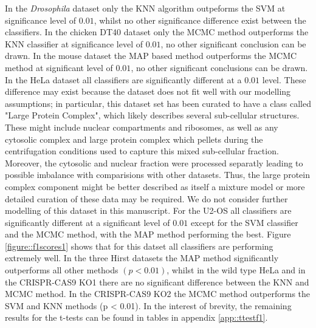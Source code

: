 \documentclass[12pt,english]{article}\usepackage[]{graphicx}\usepackage[]{color}
\begin{document}
In the \textit{Drosophila} dataset only the KNN algorithm outpeforms the SVM at significance level of $0.01$, whilst no other significance
difference exist between the classifiers. In the chicken DT40 dataset only the MCMC method outperforms the KNN classifier at significance level of $0.01$, no other significant conclusion can be drawn. In the mouse dataset the MAP based method outperforms the MCMC method at significant level of $0.01$, no other significant conclusions can be drawn. In the HeLa dataset all classifiers are significantly different at a $0.01$ level. These difference may exist because the dataset does not fit well with our modelling assumptions; in particular, this dataset set has been curated to have a class called "Large Protein Complex", which likely describes several sub-cellular structures. These might include nuclear compartments and ribosomes, as well as any cytosolic complex and large protein complex which pellets during the centrifugation conditions used to capture
this mixed sub-cellular fraction. Moreover, the cytosolic and nuclear fraction were processed separatly leading to possible imbalance with comparisions with other datasets. Thus, the large protein complex component might be better described as itself a mixture model or more detailed curation of these data may be required. We do not consider further modelling of this dataset in this manuscript. For the U2-OS all classifiers are significantly different at a significant level of $0.01$ except for the SVM classifier and the MCMC method, with the MAP method performing the best. Figure \ref{figure::f1scores1} shows that for this datset all classifiers are performing extremely well. In the three Hirst datasets the MAP method significantly outperforms all other methods $(p < 0.01)$, whilst in the wild type HeLa and in the CRISPR-CAS9 KO1 there are no significant difference between the KNN and MCMC method. In the CRISPR-CAS9 KO2 the MCMC method outperforms the SVM and KNN methods (p < 0.01). In the interest of brevity, the remaining results for the t-tests can be found in tables in appendix \ref{app::ttestf1}.
\end{document}
